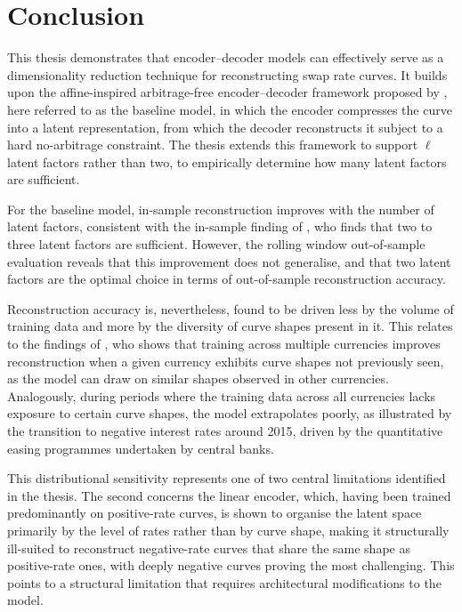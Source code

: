 \chapter{Conclusion}
\label{chap:con}

This thesis demonstrates that encoder--decoder models can effectively serve as a dimensionality reduction technique for reconstructing swap rate curves. It builds upon the affine-inspired arbitrage-free encoder--decoder framework proposed by \citet{MatinWanPoulsen2025}, here referred to as the baseline model, in which the encoder compresses the curve into a latent representation, from which the decoder reconstructs it subject to a hard no-arbitrage constraint. The thesis extends this framework to support $\ell$ latent factors rather than two, to empirically determine how many latent factors are sufficient.

For the baseline model, in-sample reconstruction improves with the number of latent factors, consistent with the in-sample finding of \citet{Andreasen2023}, who finds that two to three latent factors are sufficient. However, the rolling window out-of-sample evaluation reveals that this improvement does not generalise, and that two latent factors are the optimal choice in terms of out-of-sample reconstruction accuracy.



Reconstruction accuracy is, nevertheless, found to be driven less by the volume of training data and more by the diversity of curve shapes present in it. This relates to the findings of \citet{Sokol2022}, who shows that training across multiple currencies improves reconstruction when a given currency exhibits curve shapes not previously seen, as the model can draw on similar shapes observed in other currencies. Analogously, during periods where the training data across all currencies lacks exposure to certain curve shapes, the model extrapolates poorly, as illustrated by the transition to negative interest rates around 2015, driven by the quantitative easing programmes undertaken by central banks.



This distributional sensitivity represents one of two central limitations identified in the thesis. The second concerns the linear encoder, which, having been trained predominantly on positive-rate curves, is shown to organise the latent space primarily by the level of rates rather than by curve shape, making it structurally ill-suited to reconstruct negative-rate curves that share the same shape as positive-rate ones, with deeply negative curves proving the most challenging. This points to a structural limitation that requires architectural modifications to the model.

